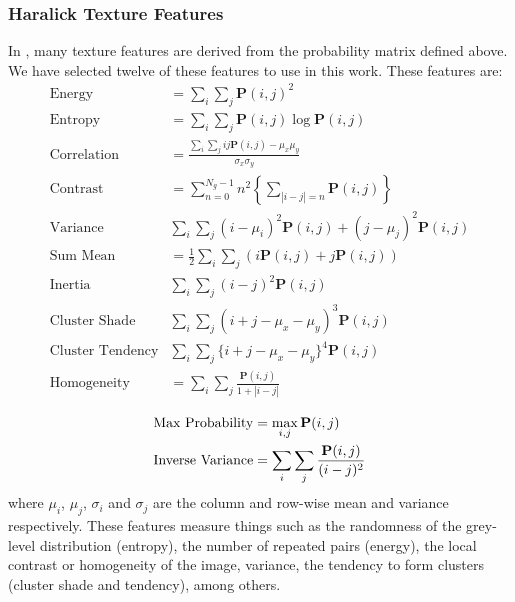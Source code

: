 \subsubsection{Haralick Texture Features}\label{sec:haralickFeatures}
In \cite{Haralick73,Haralick1992a}, many texture features are derived from the probability matrix defined above. We have selected twelve of these features to use in this work. These features are: 
\begin{align}\label{eq:energy}
\text{Energy} & = \sum\limits_i\sum\limits_j \mathbf{P}(i,j)^2\\ \label{eq:entropy}
\text{Entropy} & = \sum\limits_i\sum\limits_j \mathbf{P}(i,j) \log \mathbf{P}(i,j)\\\label{eq:correlation}
\text{Correlation} & = \frac{\sum_i\sum_j ij\mathbf{P}(i,j) - \mu_x\mu_y}{\sigma_x\sigma_y}\\\label{eq:contrastHar}
\text{Contrast} & = \sum\limits_{n=0}^{N_g-1} n^2 \left\lbrace\sum\limits_{|i-j|=n}\mathbf{P}(i,j)\right\rbrace  \\
\text{Variance} & \sum\limits_i\sum\limits_j (i-\mu_i)^2 \mathbf{P}(i,j)+ (j-\mu_j)^2\mathbf{P}(i,j)\\
\text{Sum Mean} & = \frac{1}{2} \sum\limits_i\sum\limits_j(i\mathbf{P}(i,j)+j\mathbf{P}(i,j))\\
\text{Inertia} & \sum\limits_i\sum\limits_j (i-j)^2\mathbf{P}(i,j)\\
\text{Cluster Shade} & \sum\limits_i\sum\limits_j (i+j-\mu_x-\mu_y)^3 \mathbf{P}(i,j)\\
\text{Cluster Tendency} & \sum\limits_i\sum\limits_j \{ i+j-\mu_x-\mu_y\}^4 \mathbf{P}(i,j)\\\label{eq:homogeneity}
\text{Homogeneity} & = \sum\limits_i\sum\limits_j \frac{\mathbf{P}(i,j)}{1+|i-j|}\\
\end{align}
\begin{align}
\text{Max Probability} & = \max_{i,j} \mathbf{P}(i,j)\\
\text{Inverse Variance} & = \sum\limits_i\sum\limits_j {\mathbf{P}(i,j) \over (i-j)^2}
\end{align}
where $\mu_i$, $\mu_j$, $\sigma_i$ and $\sigma_j$ are the column and row-wise mean and variance respectively. These features measure things such as the randomness of the grey-level distribution (entropy), the number of repeated pairs (energy), the local contrast or homogeneity of the image, variance, the tendency to form clusters (cluster shade and tendency), among others. 

